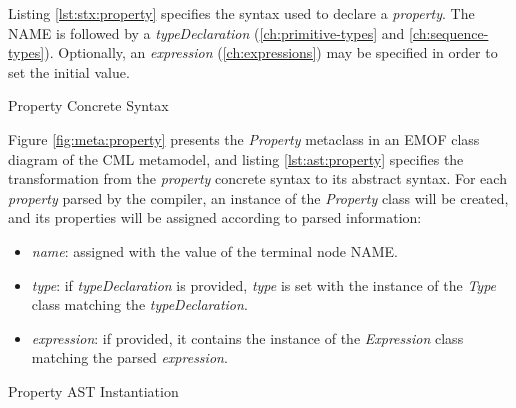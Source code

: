Listing \ref{lst:stx:property} specifies the syntax used
to declare a \emph{property}.
The NAME is followed by a \emph{typeDeclaration}
(\ref{ch:primitive-types} and \ref{ch:sequence-types}).
Optionally, an \emph{expression} (\ref{ch:expressions}) may be specified
in order to set the initial value.

\begin{code}
\verbatimfont{\small}

\caption{Property Concrete Syntax}
\label{lst:stx:property}
\end{code}

Figure \ref{fig:meta:property} presents the \emph{Property} metaclass
in an EMOF \cite{mof} class diagram of the CML metamodel,
and listing \ref{lst:ast:property} specifies
the transformation
from the \emph{property} concrete syntax to its abstract syntax.
For each \emph{property} parsed by the compiler,
an instance of the \emph{Property} class will be created,
and its properties will be assigned
according to parsed information:

\begin{itemize}

\item \emph{name}:
assigned with the value of the terminal node NAME.

\item \emph{type}:
if \emph{typeDeclaration} is provided,
\emph{type} is set with the instance of the \emph{Type} class
matching the \emph{typeDeclaration}.

\item \emph{expression}:
if provided,
it contains the instance of the \emph{Expression} class
matching the parsed \emph{expression}.

\end{itemize}

\begin{code}
\verbatimfont{\small}

\caption{Property AST Instantiation}
\label{lst:ast:property}
\end{code}
